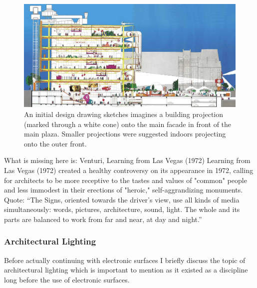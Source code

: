 \begin{figure} [h!]
    \centering
        \includegraphics[width=\textwidth]{Illustrations/centre_pompidou.jpg}
    \caption[Centre Pompidou,(1971)]{An initial design drawing sketches imagines a building projection (marked through a white cone) onto the main facade in front of the main plaza. Smaller projections were suggested indoors projecting onto the outer front.}
    \label{centre_pompidou}
\end{figure}



What is missing here is: Venturi, Learning from Las Vegas (1972)
Learning from Las Vegas (1972) created a healthy controversy on its appearance in 1972, calling for architects to be more receptive to the tastes and values of "common" people and less immodest in their erections of "heroic," self-aggrandizing monuments.
Quote: “The Signs, oriented towards the driver’s view, use all kinds of media simultaneously: words, pictures, architecture, sound, light. The whole and its parts are balanced to work from far and near, at day and night.”


\subsubsection{Architectural Lighting}

Before actually continuing with electronic surfaces I briefly discuss the topic of architectural lighting which is important to mention as it existed as a discipline long before the use of electronic surfaces.


